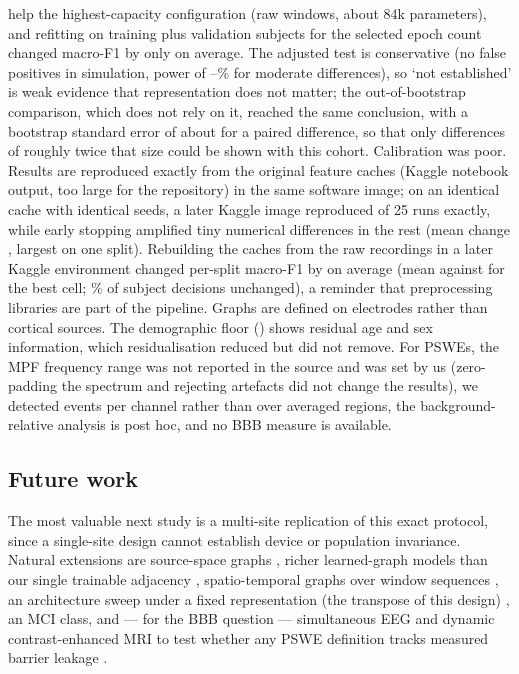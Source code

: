 help the highest-capacity configuration (raw windows, about 84k parameters), and refitting on training
plus validation subjects for the selected epoch count changed macro-F1 by only  on
average. The adjusted test is conservative (no false positives in simulation, power of \simAltNbLo--\simCorrNbPowHi\%
for moderate differences), so `not established' is weak evidence that representation does not matter; the
out-of-bootstrap comparison, which does not rely on it, reached the same conclusion, with a bootstrap
standard error of about \bootSeMed{} for a paired difference, so that only differences of roughly twice
that size could be shown with this cohort. Calibration was poor. Results are reproduced exactly from the original feature caches (Kaggle notebook output, too large for the repository) in the same software image; on an identical cache with identical seeds, a later Kaggle image reproduced \reproNSame{} of 25 runs exactly, while early stopping amplified tiny numerical differences in the rest (mean change \reproMeanDiff{}, largest \reproMaxDiff{} on one split). Rebuilding the caches from the raw recordings in a later Kaggle environment changed per-split macro-F1 by
 on average (mean  against  for the best cell;
\% of subject decisions unchanged), a reminder that preprocessing libraries are part of
the pipeline. Graphs are
defined on electrodes rather than cortical sources. The demographic floor (\demoFOne) shows residual
age and sex information, which residualisation reduced but did not remove. For PSWEs, the MPF
frequency range was not reported in the source and was set by us (zero-padding the spectrum and
rejecting artefacts did not change the results), we detected events per channel
rather than over averaged regions, the background-relative analysis is post hoc, and no BBB measure
is available.

\subsection{Future work}
The most valuable next study is a multi-site replication of this exact protocol, since a single-site
design cannot establish device or population invariance. Natural extensions are source-space graphs
\cite{F7}, richer learned-graph models than our single trainable adjacency \cite{F4}, spatio-temporal graphs over window sequences \cite{R10,F6},
an architecture sweep under a fixed representation (the transpose of this design) \cite{F5}, an
MCI class, and --- for the BBB question --- simultaneous EEG and dynamic contrast-enhanced MRI to test
whether any PSWE definition tracks measured barrier leakage \cite{B5,B8}.
